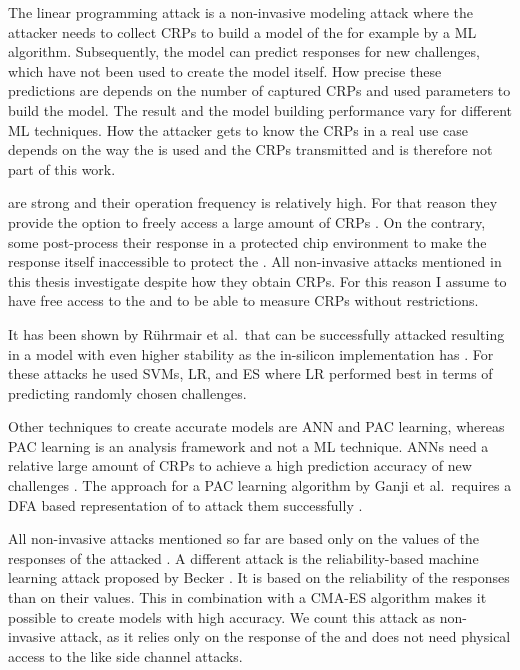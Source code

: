 The linear programming attack is a non-invasive modeling attack where the attacker needs to collect \acp{CRP} to build a model of the \puf for example by a \ac{ML} algorithm.
Subsequently, the model can predict responses for new challenges, which have not been used to create the model itself.
How precise these predictions are depends on the number of captured \acp{CRP} and used parameters to build the model. %
The result and the model building performance vary for different \ac{ML} techniques.
How the attacker gets to know the \acp{CRP} in a real use case depends on the way the \puf is used and the \acp{CRP} transmitted and is therefore not part of this work. %

\apufs are strong \pufs and their operation frequency is relatively high.
For that reason they provide the option to freely access a large amount of \acp{CRP} \cite{Ruhrmair2010ModelingFunctions}. %
On the contrary, some \pufs post-process their response in a protected chip environment to make the \puf response itself inaccessible to protect the \puf \cite{Suh2007PhysicalGeneration, Gassend2004IdentificationCircuits}.
All non-invasive attacks mentioned in this thesis investigate \pufs despite how they obtain \acp{CRP}.
For this reason I assume to have free access to the \puf and to be able to measure \acp{CRP} without restrictions.

It has been shown by Rührmair et al.\ that \apufs can be successfully attacked resulting in a model with even higher stability as the \apuf in-silicon implementation has \cite{Ruhrmair2010ModelingFunctions}.
For these attacks he used \acp{SVM}, \ac{LR}, and \ac{ES} where \ac{LR} performed best in terms of predicting randomly chosen challenges. %

Other techniques to create accurate \apuf models are \ac{ANN} and \ac{PAC} learning, whereas \ac{PAC} learning is an analysis framework and not a \ac{ML} technique. %
\acp{ANN} need a relative large amount of \acp{CRP} to achieve a high prediction accuracy of new challenges \cite{Hospodar2012MachineUsability}.
The approach for a \ac{PAC} learning algorithm by Ganji et al.\ requires a \ac{DFA} based representation of \apufs to attack them successfully \cite{Ganji2016PACPUFs}.

All non-invasive attacks mentioned so far are based only on the values of the responses of the attacked \puf.
A different attack is the reliability-based machine learning attack proposed by Becker \cite{Becker2015ThePUFs}. %
It is based on the reliability of the \puf responses than on their values. 
This in combination with a \ac{CMA-ES} algorithm makes it possible to create \apuf models with high accuracy.
We count this attack as non-invasive attack, as it relies only on the response of the \puf and does not need physical access to the \puf like side channel attacks.

